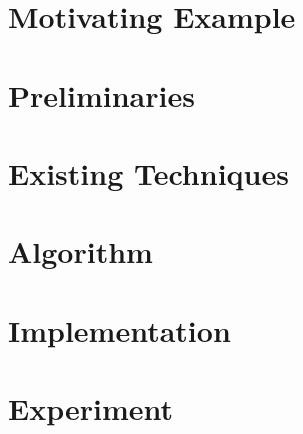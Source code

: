 \documentclass{llncs}
\begin{document}
\section{Motivating Example}
\label{sec:mot-example}



\section{Preliminaries}
\label{sec:preliminaries}



\section{Existing Techniques}
\label{sec:existing-techniques}



\section{Algorithm}
\label{sec:algorithm}



\section{Implementation}
\label{sec:impl}



\section{Experiment}
\label{sec:experiment}

\end{document}
